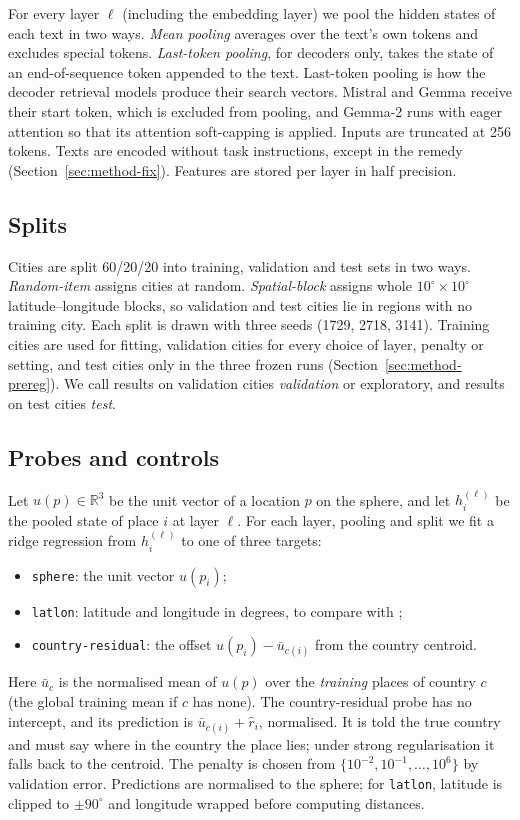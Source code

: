 For every layer $\ell$ (including the embedding layer) we pool the hidden states of each text in two ways. \emph{Mean pooling} averages over the text's own tokens and excludes special tokens. \emph{Last-token pooling}, for decoders only, takes the state of an end-of-sequence token appended to the text. Last-token pooling is how the decoder retrieval models produce their search vectors. Mistral and Gemma receive their start token, which is excluded from pooling, and Gemma-2 runs with eager attention so that its attention soft-capping is applied. Inputs are truncated at 256 tokens. Texts are encoded without task instructions, except in the remedy (Section~\ref{sec:method-fix}). Features are stored per layer in half precision.

\subsection{Splits}
\label{sec:method-splits}

Cities are split 60/20/20 into training, validation and test sets in two ways. \emph{Random-item} assigns cities at random. \emph{Spatial-block} assigns whole $10^\circ\times10^\circ$ latitude--longitude blocks, so validation and test cities lie in regions with no training city. Each split is drawn with three seeds (1729, 2718, 3141). Training cities are used for fitting, validation cities for every choice of layer, penalty or setting, and test cities only in the three frozen runs (Section~\ref{sec:method-prereg}). We call results on validation cities \emph{validation} or exploratory, and results on test cities \emph{test}.

\subsection{Probes and controls}
\label{sec:method-probes}

Let $u(p)\in\mathbb{R}^3$ be the unit vector of a location $p$ on the sphere, and let $h_i^{(\ell)}$ be the pooled state of place $i$ at layer $\ell$. For each layer, pooling and split we fit a ridge regression from $h_i^{(\ell)}$ to one of three targets:
\begin{itemize}
\item \texttt{sphere}: the unit vector $u(p_i)$;
\item \texttt{latlon}: latitude and longitude in degrees, to compare with \citet{gurnee2024space};
\item \texttt{country-residual}: the offset $u(p_i)-\bar u_{c(i)}$ from the country centroid.
\end{itemize}
Here $\bar u_c$ is the normalised mean of $u(p)$ over the \emph{training} places of country $c$ (the global training mean if $c$ has none). The country-residual probe has no intercept, and its prediction is $\bar u_{c(i)}+\hat r_i$, normalised. It is told the true country and must say where in the country the place lies; under strong regularisation it falls back to the centroid. The penalty is chosen from $\{10^{-2},10^{-1},\dots,10^{6}\}$ by validation error. Predictions are normalised to the sphere; for \texttt{latlon}, latitude is clipped to $\pm90^\circ$ and longitude wrapped before computing distances.


